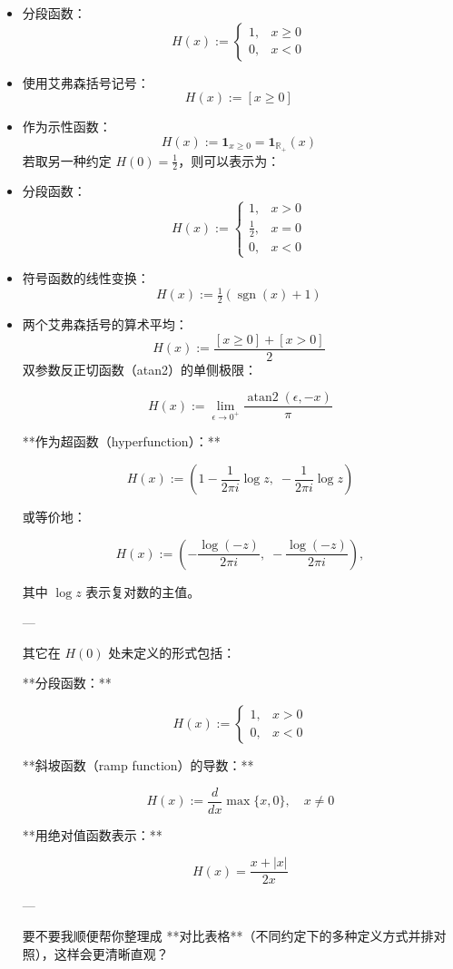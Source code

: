 \begin{itemize}
\item 分段函数：
$$
H(x) := 
\begin{cases} 
1, & x \geq 0 \\[6pt] 
0, & x < 0 
\end{cases}~
$$
\item 使用艾弗森括号记号：
$$
H(x) := [x \geq 0]~
$$
\item 作为示性函数：
$$
H(x) := \mathbf{1}_{x \geq 0} = \mathbf{1}_{\mathbb{R}_{+}}(x)~
$$
若取另一种约定 $H(0) = \tfrac{1}{2}$，则可以表示为：
\item 分段函数：
$$
H(x) := 
\begin{cases} 
1, & x > 0 \\[6pt] 
\tfrac{1}{2}, & x = 0 \\[6pt] 
0, & x < 0 
\end{cases}~
$$
\item 符号函数的线性变换：
$$
H(x) := \tfrac{1}{2}\left(\operatorname{sgn}(x) + 1\right)~
$$
\item 两个艾弗森括号的算术平均：
$$
H(x) := \frac{[x \geq 0] + [x > 0]}{2}~
$$
双参数反正切函数（atan2）的单侧极限：

$$
H(x) := \lim_{\epsilon \to 0^{+}} \frac{\operatorname{atan2}(\epsilon, -x)}{\pi}
$$

**作为超函数（hyperfunction）：**

$$
H(x) := \left( 1 - \frac{1}{2\pi i}\log z, \; -\frac{1}{2\pi i}\log z \right)
$$

或等价地：

$$
H(x) := \left( -\frac{\log(-z)}{2\pi i}, \; -\frac{\log(-z)}{2\pi i} \right),
$$

其中 $\log z$ 表示复对数的主值。

---

其它在 $H(0)$ 处未定义的形式包括：

**分段函数：**

$$
H(x) := 
\begin{cases} 
1, & x > 0 \\[6pt] 
0, & x < 0 
\end{cases}
$$

**斜坡函数（ramp function）的导数：**

$$
H(x) := \frac{d}{dx}\max\{x,0\}, \quad x \neq 0
$$

**用绝对值函数表示：**

$$
H(x) = \frac{x + |x|}{2x}
$$

---

要不要我顺便帮你整理成 **对比表格**（不同约定下的多种定义方式并排对照），这样会更清晰直观？

\end{itemize}